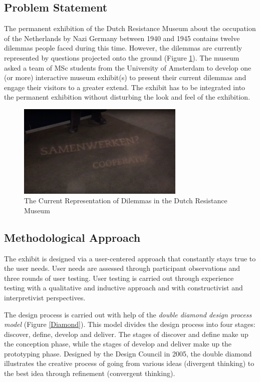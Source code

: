 \subsection{Problem Statement} \label{Problem}
The permanent exhibition of the Dutch Resistance Museum about the occupation of the Netherlands by Nazi Germany between 1940 and 1945 contains twelve dilemmas people faced during this time. However, the dilemmas are currently represented by questions projected onto the ground (Figure \ref{dilemma}). The museum asked a team of MSc students from the University of Amsterdam to develop one (or more) interactive museum exhibit(s) to present their current dilemmas and engage their visitors to a greater extend. The exhibit has to be integrated into the permanent exhibition without disturbing the look and feel of the exhibition.

\begin{figure} [H]
\includegraphics[width=8cm]{assets/dilemma.jpg}
\caption{The Current Representation of Dilemmas in the Dutch Resistance Museum}
\centering
\label{dilemma}
\end{figure}

\subsection{Methodological Approach} \label{Methodological Approach}
The exhibit is designed via a user-centered approach that constantly stays true to the user needs. User needs are assessed through participant observations and three rounds of user testing. User testing is carried out through experience testing with a qualitative and inductive approach and with constructivist and interpretivist perspectives.

The design process is carried out with help of the \textit{double diamond design process model} (Figure \ref{Diamond}). This model divides the design process into four stages: discover, define, develop and deliver. The stages of discover and define make up the conception phase, while the stages of develop and deliver make up the prototyping phase. Designed by the Design Council in 2005, the double diamond illustrates the creative process of going from various ideas (divergent thinking) to the best idea through refinement (convergent thinking)\cite{UKDesignCouncil2005AProcess}. 

